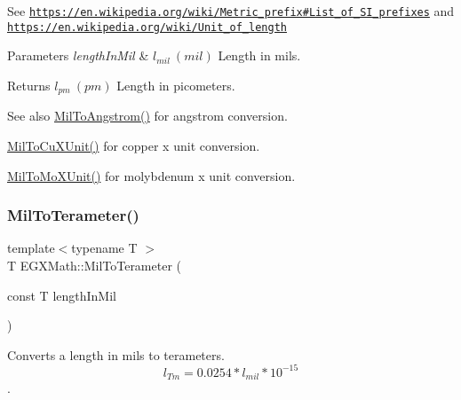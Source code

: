 See \href{https://en.wikipedia.org/wiki/Metric_prefix#List_of_SI_prefixes}{\tt https\+://en.\+wikipedia.\+org/wiki/\+Metric\+\_\+prefix\#\+List\+\_\+of\+\_\+\+S\+I\+\_\+prefixes} and \href{https://en.wikipedia.org/wiki/Unit_of_length}{\tt https\+://en.\+wikipedia.\+org/wiki/\+Unit\+\_\+of\+\_\+length} 
\begin{DoxyParams}{Parameters}
{\em length\+In\+Mil} & $ l_{mil}\ (mil)$ Length in mils. \\
\hline
\end{DoxyParams}
\begin{DoxyReturn}{Returns}
$ l_{pm}\ (pm)$ Length in picometers. 
\end{DoxyReturn}
\begin{DoxySeeAlso}{See also}
\mbox{\hyperlink{group___e_g_x_math-_conversions-_length_conversions-_imperial-_mil-_non-_s_i_gad209d1b047ce810b8879b9ea1ff4a5a5}{Mil\+To\+Angstrom()}} for angstrom conversion. 

\mbox{\hyperlink{group___e_g_x_math-_conversions-_length_conversions-_imperial-_mil-_non-_s_i_ga92f713e3dddc0a45caa3fc6b5e8ca442}{Mil\+To\+Cu\+X\+Unit()}} for copper x unit conversion. 

\mbox{\hyperlink{group___e_g_x_math-_conversions-_length_conversions-_imperial-_mil-_non-_s_i_ga673efde012cc982641b2eb1266f88f3a}{Mil\+To\+Mo\+X\+Unit()}} for molybdenum x unit conversion. 
\end{DoxySeeAlso}
\mbox{\label{group___e_g_x_math-_conversions-_length_conversions-_imperial-_mil-_s_i_gae1b1a9a71113ba048bcbfacdea2b6d11}} 
\subsubsection{\texorpdfstring{Mil\+To\+Terameter()}{MilToTerameter()}}
{\footnotesize\ttfamily template$<$typename T $>$ \\
T E\+G\+X\+Math\+::\+Mil\+To\+Terameter (\begin{DoxyParamCaption}\item[{const T}]{length\+In\+Mil }\end{DoxyParamCaption})}



Converts a length in mils to terameters. \[ l_{Tm}=0.0254* l_{mil} * 10^{-15} \]. 

